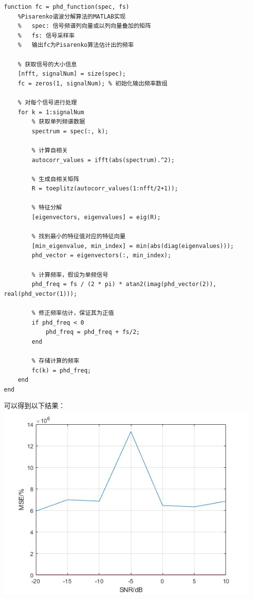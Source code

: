 \documentclass[a4paper,12pt]{article}
\begin{document}
\begin{lstlisting}
function fc = phd_function(spec, fs)
    %Pisarenko谐波分解算法的MATLAB实现
    %   spec: 信号频谱列向量或以列向量叠加的矩阵
    %   fs: 信号采样率
    %   输出fc为Pisarenko算法估计出的频率

    % 获取信号的大小信息
    [nfft, signalNum] = size(spec);
    fc = zeros(1, signalNum); % 初始化输出频率数组
    
    % 对每个信号进行处理
    for k = 1:signalNum
        % 获取单列频谱数据
        spectrum = spec(:, k);

        % 计算自相关
        autocorr_values = ifft(abs(spectrum).^2);

        % 生成自相关矩阵
        R = toeplitz(autocorr_values(1:nfft/2+1));

        % 特征分解
        [eigenvectors, eigenvalues] = eig(R);
        
        % 找到最小的特征值对应的特征向量
        [min_eigenvalue, min_index] = min(abs(diag(eigenvalues)));
        phd_vector = eigenvectors(:, min_index);
        
        % 计算频率，假设为单频信号
        phd_freq = fs / (2 * pi) * atan2(imag(phd_vector(2)), real(phd_vector(1)));
        
        % 修正频率估计，保证其为正值
        if phd_freq < 0
            phd_freq = phd_freq + fs/2;
        end
        
        % 存储计算的频率
        fc(k) = phd_freq;
    end
end

\end{lstlisting}

可以得到以下结果：
\centering 
\includegraphics[width=0.8\linewidth]{images/2_Application/phd.jpg}
\justifying
\end{document}

